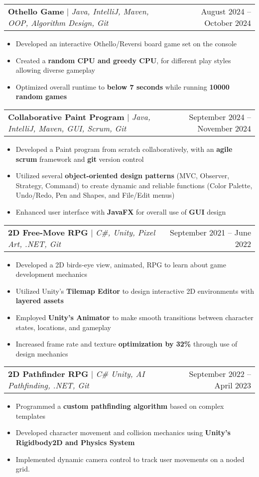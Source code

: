 \documentclass[letterpaper,11pt]{article}
\makeatletter
\newcommand{\resumeItem}[1]{
  \item\small{
    {#1 \vspace{-2pt}}
  }
}
\newcommand{\resumeProjectHeading}[2]{
    \item
    \begin{tabular*}{0.97\textwidth}{l@{\extracolsep{\fill}}r}
      \small#1 & #2 \\
    \end{tabular*}\vspace{-7pt}
}
\newcommand{\resumeItemListStart}{\begin{itemize}}
\newcommand{\resumeItemListEnd}{\end{itemize}\vspace{-5pt}}
\makeatother
\begin{document}
        \resumeProjectHeading
          {\textbf{Othello Game} $|$ \emph{Java, IntelliJ, Maven, OOP, Algorithm Design, Git}}{August 2024 -- October 2024}
          \resumeItemListStart
            \resumeItem{Developed an interactive Othello/Reversi board game set on the console}
            \resumeItem{Created a \textbf{random CPU and greedy CPU}, for different play styles allowing diverse gameplay}
             \resumeItem{Optimized overall runtime to \textbf{below 7 seconds} while running \textbf{10000 random games}}
          \resumeItemListEnd
          
        \resumeProjectHeading
          {\textbf{Collaborative Paint Program} $|$ \emph{Java, IntelliJ, Maven, GUI, Scrum, Git}}{September 2024 -- November 2024}
          \resumeItemListStart
            \resumeItem{Developed a Paint program from scratch collaboratively, with an \textbf{agile scrum} framework and \textbf{git} version control}
            \resumeItem{Utilized several \textbf{object-oriented design patterns} (MVC, Observer, Strategy, Command) to create dynamic and reliable functions (Color Palette, Undo/Redo, Pen and Shapes, and File/Edit menus)}
            \resumeItem{Enhanced user interface with \textbf{JavaFX} for overall use of \textbf{GUI} design}
          \resumeItemListEnd
    
      \resumeProjectHeading
          {\textbf{2D Free-Move RPG} $|$ \emph{C\#, Unity, Pixel Art, .NET, Git}}{September 2021 -- June 2022}
          \resumeItemListStart
            \resumeItem{Developed a 2D birds-eye view, animated, RPG to learn about game development mechanics}
            \resumeItem{Utilized Unity’s \textbf{Tilemap Editor} to design interactive 2D environments with \textbf{layered assets}}
            \resumeItem{Employed \textbf{Unity’s Animator} to make smooth transitions between character states, locations, and gameplay} 
            \resumeItem{Increased frame rate and texture \textbf{optimization by 32\%} through use of design mechanics}
          \resumeItemListEnd
          
      \resumeProjectHeading
          {\textbf{2D Pathfinder RPG} $|$ \emph{C\# Unity, AI Pathfinding, .NET, Git}}{September 2022 -- April 2023}
          \resumeItemListStart
            \resumeItem{Programmed a \textbf{custom pathfinding algorithm} based on complex templates}
            \resumeItem{Developed character movement and collision mechanics using \textbf{Unity's Rigidbody2D and Physics System}}
            \resumeItem{Implemented dynamic camera control to track user movements on a noded grid.}
          \resumeItemListEnd
          
\end{document}
